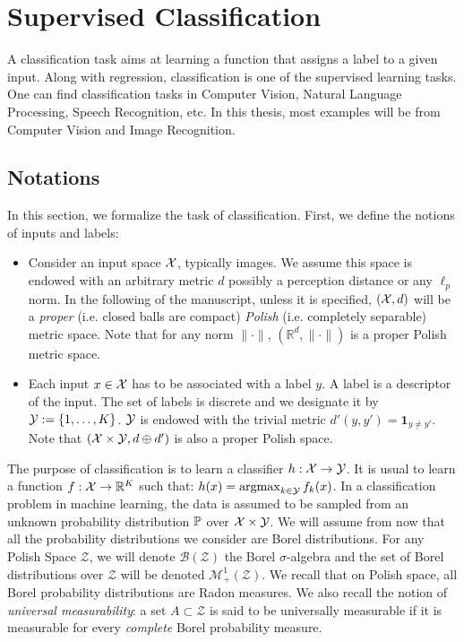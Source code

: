 \section{Supervised Classification}
A classification task aims at learning a function that assigns a label to a given input. Along with regression, classification is one of the  supervised learning tasks. One can find classification tasks in Computer Vision, Natural Language Processing, Speech Recognition, etc. In this thesis, most examples will be from Computer Vision and Image Recognition. 
\subsection{Notations}
In this section, we formalize the task of classification. First, we define the notions of inputs and labels:
\begin{itemize}
    \item Consider an input space $\mathcal{X}$, typically images. We assume this space is endowed with an arbitrary metric $d$ possibly a perception distance or any $\ell_p$ norm. In the following of the manuscript, unless it is specified, $(\mathcal{X},d)$ will be a \textit{proper} (i.e. closed balls are compact) \textit{Polish} (i.e. completely separable) metric space. Note that for any norm $\lVert\cdot\rVert$,  $(\mathbb{R}^d,\lVert\cdot\rVert)$ is a proper Polish metric space.
    \item Each input $x\in \mathcal{X}$ has to be associated with a label $y$. A label is a descriptor of the input. The set of labels is discrete and we designate it by $\mathcal{Y}:=\{1,\dots,K\}$. $\mathcal{Y}$ is endowed with the trivial metric  $d'(y,y') = \mathbf{1}_{y\neq y'}$. Note that $(\mathcal{X}\times\mathcal{Y},d\oplus d')$ is also a proper Polish space.
\end{itemize}

The purpose of classification is to learn a classifier $h:\mathcal{X}\to\mathcal{Y}$. It is usual to learn a function $f:\mathcal{X}\to\mathbb{R}^K$ such that: $h(x) = \operatorname*{argmax}_{k\in\mathcal{Y}}f_k(x)$. In a classification problem in machine learning, the data is assumed to be sampled from an unknown probability distribution $\mathbb{P}$ over $\mathcal{X}\times\mathcal{Y}$. We will assume from now that all the probability distributions we consider are Borel distributions. For any Polish Space $\mathcal{Z}$, we will denote $\mathcal{B}(\mathcal{Z})$ the Borel $\sigma$-algebra and the set of Borel distributions over $\mathcal{Z}$  will be denoted $\mathcal{M}_+^1(\mathcal{Z})$. We recall that on Polish space, all Borel probability distributions are Radon measures. We also recall the notion of \textit{universal measurability}: a set $A\subset \mathcal{Z}$ is said to be universally measurable if it is measurable for every \textit{complete} Borel probability measure.




